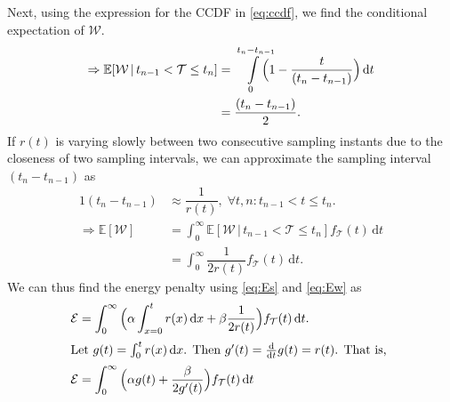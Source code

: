 Next, using the expression for the \gls{CCDF} in \cref{eq:ccdf}, we find the conditional expectation of $\mathcal{W}$.
\begin{alignat*}{1}
\Rightarrow \mathbb{E}[\mathcal{W}\,|\,t_{n-1}<\mathcal{T}\leq t_n]&=\smashoperator[r]{\int_{0}^{t_n-t_{n-1}}}\Big(1-\dfrac{t}{(t_{n}-t_{n-1})}\Big)\,\mathrm{d}t\\
&=\dfrac{(t_n-t_{n-1})}{2}.
\end{alignat*}
If $r(t)$ is varying slowly between two consecutive sampling instants due to the closeness of two sampling intervals, we can approximate the sampling interval $(t_n\!-\!t_{n-1})$ as
\begin{alignat}{1}
 (t_n-t_{n-1})&\approx\dfrac{1}{r(t)},\;\forall t,n:t_{n-1}\!<\!t\!\leq\!t_n.\label{eq:Apx3}\\
\Rightarrow \mathbb{E}[\mathcal{W}]&=\int_{0}^{\infty}\mathbb{E}[\mathcal{W}\,|\,t_{n-1}<\mathcal{T}\leq t_n]f_\mathcal{T}(t)\,\mathrm{d}t\nonumber\\
&=\int_{0}^{\infty}\dfrac{1}{2r(t)}f_\mathcal{T}(t)\,\mathrm{d}t.\label{eq:Ew}
\end{alignat}
We can thus find the energy penalty using \cref{eq:Es} and \cref{eq:Ew} as
\begin{alignat*}{1}
\mathcal{E}&=\int_{0}^{\infty}\Big(\alpha\int_{x=0}^{t}r(x)\,\mathrm{d}x+\beta\dfrac{1}{2r(t)}\Big)f_{\mathcal{T}}(t)\,\mathrm{d}t.\label{eq:epsilon_eulerForm}\\
\intertext{%
    Let $g(t)=\int_{0}^{t}r(x)\dif x$.
    Then  $g'(t)=\tfrac{\mathrm{d}}{\mathrm{d}t}g(t)=r(t)$.
    That is,
}
\mathcal{E}&=\int_{0}^{\infty}\Big(\alpha g(t)+\dfrac{\beta}{2g'(t)}\Big)f_{\mathcal{T}}(t)\,\mathrm{d}t
\end{alignat*}

